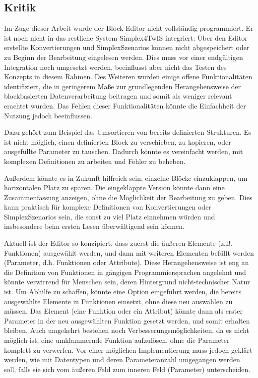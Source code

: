 \subsection{Kritik}
\label{sec:criticism}

Im Zuge dieser Arbeit wurde der Block-Editor nicht vollständig programmiert. Er ist noch nicht in das restliche System Simplex4TwIS integriert: Über den Editor erstellte Konvertierungen und SimplexSzenarios können nicht abgespeichert oder zu Beginn der Bearbeitung eingelesen werden. Dies muss vor einer endgültigen Integration noch umgesetzt werden, beeinflusst aber nicht das Testen des Konzepts in diesem Rahmen. Des Weiteren wurden einige offene Funktionalitäten identifiziert, die in geringerem Maße zur grundlegenden Herangehensweise der blockbasierten Datenverarbeitung beitragen und somit als weniger relevant erachtet wurden. Das Fehlen dieser Funktionalitäten könnte die Einfachheit der Nutzung jedoch beeinflussen.

Dazu gehört zum Beispiel das Umsortieren von bereits definierten Strukturen. Es ist nicht möglich, einen definierten Block zu verschieben, zu kopieren, oder ausgefüllte Parameter zu tauschen. Dadurch könnte es vereinfacht werden, mit komplexen Definitionen zu arbeiten und Fehler zu beheben.

Außerdem könnte es in Zukunft hilfreich sein, einzelne Blöcke einzuklappen, um horizontalen Platz zu sparen. Die eingeklappte Version könnte dann eine Zusammenfassung anzeigen, ohne die Möglichkeit der Bearbeitung zu geben. Dies kann praktisch für komplexe Definitionen von Konvertierungen oder SimplexSzenarios sein, die sonst zu viel Platz einnehmen würden und insbesondere beim ersten Lesen überwältigend sein können.

Aktuell ist der Editor so konzipiert, dass zuerst die äußeren Elemente (z.B. Funktionen) ausgewählt werden, und dann mit weiteren Elementen befüllt werden (Parameter, d.h. Funktionen oder Attribute). Diese Herangehensweise ist eng an die Definition von Funktionen in gängigen Programmiersprachen angelehnt und könnte verwirrend für Menschen sein, deren Hintergrund nicht-technischer Natur ist. Um Abhilfe zu schaffen, könnte eine Option eingeführt werden, die bereits ausgewählte Elemente in Funktionen einsetzt, ohne diese neu auswählen zu müssen. Das Element (eine Funktion oder ein Attribut) könnte dann als erster Parameter in der neu ausgewählten Funktion gesetzt werden, und somit erhalten bleiben. Auch umgekehrt bestehen noch Verbesserungsmöglichkeiten, da es nicht möglich ist, eine umklammernde Funktion aufzulösen, ohne die Parameter komplett zu verwerfen. Vor einer möglichen Implementierung muss jedoch geklärt werden, wie mit Datentypen und deren Parameteranzahl umgegangen werden soll, falls sie sich vom äußeren Feld zum inneren Feld (Parameter) unterscheiden.

